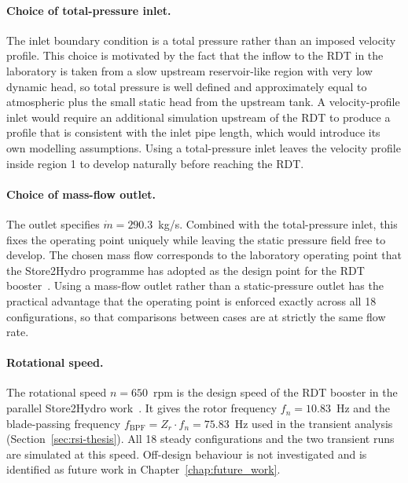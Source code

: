 \paragraph{Choice of total-pressure inlet.}
The inlet boundary condition is a total pressure rather than an imposed velocity profile. This choice is motivated by the fact that the inflow to the RDT in the laboratory is taken from a slow upstream reservoir-like region with very low dynamic head, so total pressure is well defined and approximately equal to atmospheric plus the small static head from the upstream tank. A velocity-profile inlet would require an additional simulation upstream of the RDT to produce a profile that is consistent with the inlet pipe length, which would introduce its own modelling assumptions. Using a total-pressure inlet leaves the velocity profile inside region 1 to develop naturally before reaching the RDT.
 
\paragraph{Choice of mass-flow outlet.}
The outlet specifies $\dot m = 290.3$~kg/s. Combined with the total-pressure inlet, this fixes the operating point uniquely while leaving the static pressure field free to develop. The chosen mass flow corresponds to the laboratory operating point that the Store2Hydro programme has adopted as the design point for the RDT booster~\cite{DjupeslandTrivedi2025, Fjuk2025}. Using a mass-flow outlet rather than a static-pressure outlet has the practical advantage that the operating point is enforced exactly across all 18 configurations, so that comparisons between cases are at strictly the same flow rate.
 
\paragraph{Rotational speed.}
The rotational speed $n = 650$~rpm is the design speed of the RDT booster in the parallel Store2Hydro work~\cite{DjupeslandTrivedi2025, Fjuk2025}. It gives the rotor frequency $f_n = 10.83$~Hz and the blade-passing frequency $f_{\mathrm{BPF}} = Z_r \cdot f_n = 75.83$~Hz used in the transient analysis (Section~\ref{sec:rsi-thesis}). All 18 steady configurations and the two transient runs are simulated at this speed. Off-design behaviour is not investigated and is identified as future work in Chapter~\ref{chap:future_work}.
 
